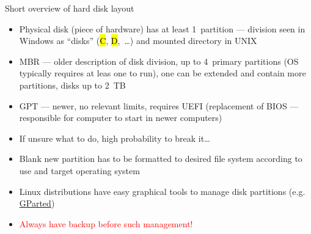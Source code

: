 \documentclass[compress, ucs, xelatex, 11pt, xcolor=svgnames, aspectratio=169,
	hyperref={
		bookmarks=true,
		unicode=true,
		colorlinks=true,
		pdftitle={Linux, command line and MetaCentrum},
		plainpages=false,
		pdfauthor={Vojtech Zeisek},
		pdfsubject={Course about use of Linux command line, writing shell scripts and using MetaCentrum of CESNET},
		pdfcreator={XeLaTeX},
		pdfkeywords={Linux, GNU, BASH, shell, command line, MetaCentrum},
		linkcolor=DarkRed, %
		anchorcolor=DarkBlue, %
		citecolor=Indigo, %
		filecolor=NavyBlue, %
		menucolor=DarkMagenta, %
		urlcolor=DarkBlue, %
		pdftex},
	url={hyphens, lowtilde} %
	]{beamer}
\renewcommand{\texttt}[1]{\hl{\ttfamily #1}}
\renewcommand{\alert}[1]{\textcolor{red}{#1}}
\begin{document}
\begin{frame}{Short overview of hard disk layout}
	\begin{itemize}
		\item Physical disk (piece of hardware) has at least 1~partition --- division seen in Windows as \enquote{disks} (\texttt{C}, \texttt{D},~\ldots) and mounted directory in UNIX
		\item MBR --- older description of disk division, up to 4~primary partitions (OS typically requires at leas one to run), one can be extended and contain more partitions, disks up to 2~TB
		\item GPT --- newer, no relevant limits, requires UEFI (replacement of BIOS --- responsible for computer to start in newer computers)
		\item If unsure what to do, high probability to break it\ldots
		\item Blank new partition has to be formatted to desired file system according to use and target operating system
		\item Linux distributions have easy graphical tools to manage disk partitions (e.g. \href{https://gparted.org/}{GParted})
		\item \alert{Always have backup before such management!}
	\end{itemize}
\end{frame}
\end{document}
